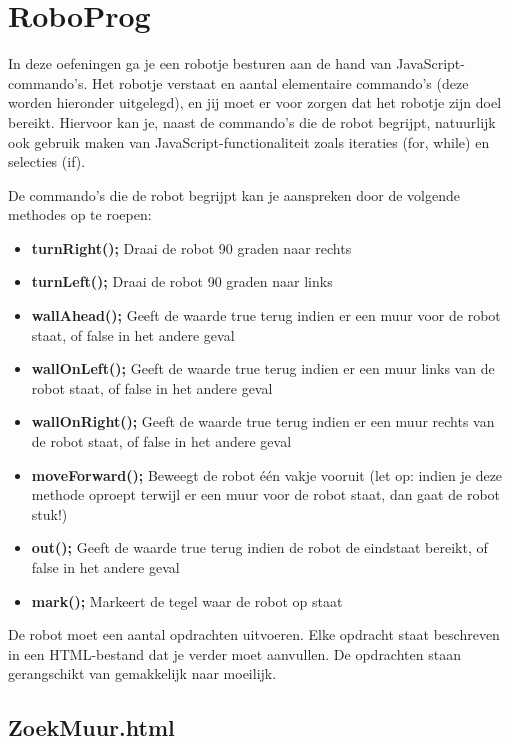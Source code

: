 \section{RoboProg}

In deze oefeningen ga je een robotje besturen aan de hand van JavaScript-commando's. Het robotje verstaat en aantal elementaire commando's (deze worden hieronder uitgelegd), en jij moet er voor zorgen dat het robotje zijn doel bereikt. Hiervoor kan je, naast de commando's die de robot begrijpt, natuurlijk ook gebruik maken van JavaScript-functionaliteit zoals iteraties (for, while) en selecties (if).

De commando's die de robot begrijpt kan je aanspreken door de volgende methodes op te roepen:

\begin{itemize}
\item \textbf{turnRight();}	Draai de robot 90 graden naar rechts
\item \textbf{turnLeft();}	Draai de robot 90 graden naar links
\item \textbf{wallAhead();}	Geeft de waarde true terug indien er een muur voor de robot staat, of false in het andere geval
\item \textbf{wallOnLeft();}	Geeft de waarde true terug indien er een muur links van de robot staat, of false in het andere geval
\item \textbf{wallOnRight();}	Geeft de waarde true terug indien er een muur rechts van de robot staat, of false in het andere geval
\item \textbf{moveForward();} Beweegt de robot \'e\'en vakje vooruit (let op: indien je deze methode oproept terwijl er een muur voor de robot staat, dan gaat de robot stuk!)
\item \textbf{out();}		Geeft de waarde true terug indien de robot de eindstaat bereikt, of false in het andere geval
\item \textbf{mark();}		Markeert de tegel waar de robot op staat
\end{itemize}

De robot moet een aantal opdrachten uitvoeren. Elke opdracht staat beschreven in een HTML-bestand dat je verder moet aanvullen. De opdrachten staan gerangschikt van gemakkelijk naar moeilijk.

\subsection{ZoekMuur.html}


